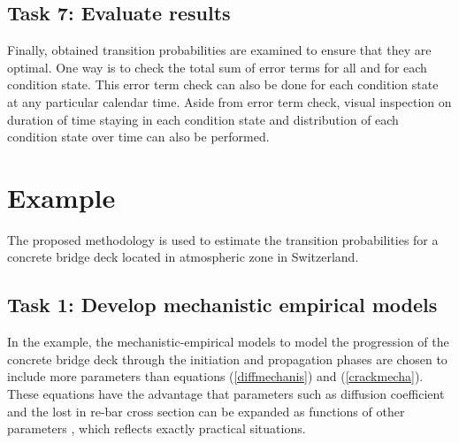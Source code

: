 \documentclass[Journal]{ascelike}
\begin{document}
% 


\subsection{Task 7: Evaluate results}

Finally, obtained transition probabilities are examined to ensure
that they are optimal. One way is to check the total sum of error
terms for all and for each condition state. This error term check
can also be done for each condition state at any particular calendar
time. Aside from error term check, visual inspection on duration of
time staying in each condition state and distribution of each condition
state over time can also be performed.


\section{Example}

\label{casestudy} The proposed methodology is used to estimate the
transition probabilities for a concrete bridge deck located in atmospheric
zone in Switzerland. 


\subsection{Task 1: Develop mechanistic empirical models}

In the example, the mechanistic-empirical models to model the progression
of the concrete bridge deck through the initiation and propagation
phases are chosen to include more parameters than equations (\ref{diffmechanis})
and (\ref{crackmecha}). These equations have the advantage that parameters
such as diffusion coefficient and the lost in re-bar cross section
can be expanded as functions of other parameters \cite{DuraCrete2000},
which reflects exactly practical situations.
\end{document}
